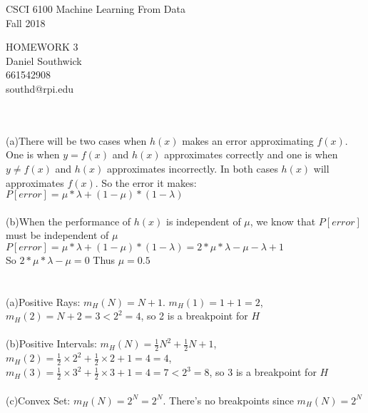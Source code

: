\documentclass[12pt]{article}
\begin{document}
\begin{center}
CSCI 6100 Machine Learning From Data\\
Fall 2018\\
\end{center}
\begin{center}
HOMEWORK 3\\
Daniel Southwick\\
661542908\\
southd@rpi.edu
\end{center}
\vspace{.1in}

 \\\\
\indent (a)There will be two cases when $h(x)$ makes an error approximating $f(x)$. One is when $y = f(x)$ and $h(x)$ approximates correctly and one is when $y \neq f(x)$ and $h(x)$ approximates incorrectly. In both cases $h(x)$ will approximates $f(x)$. So the error it makes: \\ \indent $P[error] = \mu*\lambda + (1-\mu)*(1-\lambda)$\\\\
\indent (b)When the performance of $h(x)$ is independent of $\mu$, we know that $P[error]$ must be independent of $\mu$ \\\indent$P[error] = \mu*\lambda + (1-\mu)*(1-\lambda) = 2*\mu*\lambda - \mu - \lambda +1$\\ \indent So $2*\mu*\lambda - \mu = 0$ Thus $\mu = 0.5$\\

 \\\\
\indent(a)Positive Rays: $m_H(N) = N+1$. $m_H(1) = 1+1 = 2$, $m_H(2) = N+2 = 3 < 2^2 = 4$, so 2 is a breakpoint for $H$\\\\
\indent(b)Positive Intervals: $m_H(N) = \frac{1}{2} N^2+\frac{1}{2} N+1$, $m_H(2) = \frac{1}{2}\times2^2+\frac{1}{2}\times2+1 = 4 = 4$, $m_H(3) = \frac{1}{2}\times3^2+\frac{1}{2}\times3+1 = 4 = 7 < 2^3 = 8$, so 3 is a breakpoint for $H$\\\\
\indent(c)Convex Set:  $m_H(N) = 2^N = 2^N$. There's no breakpoints since $m_H(N) = 2^N$\\
\end{document}
